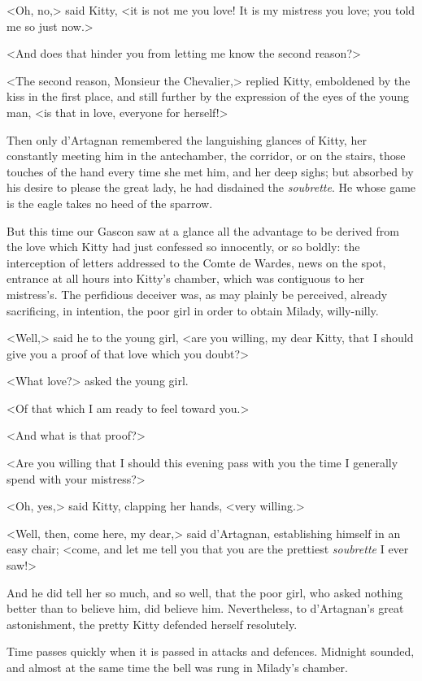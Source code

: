 <Oh, no,> said Kitty, <it is not me you love! It is my mistress you love; you told me so just now.> 

<And does that hinder you from letting me know the second reason?> 

<The second reason, Monsieur the Chevalier,> replied Kitty, emboldened by the kiss in the first place, and still further by the expression of the eyes of the young man, <is that in love, everyone for herself!> 

Then only d'Artagnan remembered the languishing glances of Kitty, her constantly meeting him in the antechamber, the corridor, or on the stairs, those touches of the hand every time she met him, and her deep sighs; but absorbed by his desire to please the great lady, he had disdained the \textit{soubrette}. He whose game is the eagle takes no heed of the sparrow. 

But this time our Gascon saw at a glance all the advantage to be derived from the love which Kitty had just confessed so innocently, or so boldly: the interception of letters addressed to the Comte de Wardes, news on the spot, entrance at all hours into Kitty's chamber, which was contiguous to her mistress's. The perfidious deceiver was, as may plainly be perceived, already sacrificing, in intention, the poor girl in order to obtain Milady, willy-nilly. 

<Well,> said he to the young girl, <are you willing, my dear Kitty, that I should give you a proof of that love which you doubt?> 

<What love?> asked the young girl. 

<Of that which I am ready to feel toward you.> 

<And what is that proof?> 

<Are you willing that I should this evening pass with you the time I generally spend with your mistress?> 

<Oh, yes,> said Kitty, clapping her hands, <very willing.> 

<Well, then, come here, my dear,> said d'Artagnan, establishing himself in an easy chair; <come, and let me tell you that you are the prettiest \textit{soubrette} I ever saw!> 

And he did tell her so much, and so well, that the poor girl, who asked nothing better than to believe him, did believe him. Nevertheless, to d'Artagnan's great astonishment, the pretty Kitty defended herself resolutely. 

Time passes quickly when it is passed in attacks and defences. Midnight sounded, and almost at the same time the bell was rung in Milady's chamber. 

